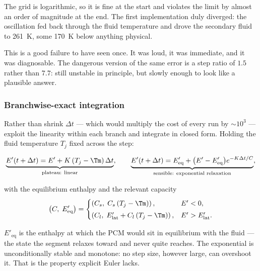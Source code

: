 \noindent
The grid is logarithmic, so it is fine at the start and violates the limit by
almost an order of magnitude at the end. The first implementation duly
diverged: the oscillation fed back through the fluid temperature and drove the
secondary fluid to \SI{261}{\kelvin}, some \SI{170}{\kelvin} below anything
physical.

This is a good failure to have seen once. It was loud, it was immediate, and it
was diagnosable. The dangerous version of the same error is a step ratio of
$1.5$ rather than $7.7$: still unstable in principle, but slowly enough to look
like a plausible answer.

\subsubsection{Branchwise-exact integration}

Rather than shrink $\Delta t$ --- which would multiply the cost of every run by
$\sim\!10^{3}$ --- exploit the linearity within each branch and integrate in
closed form. Holding the fluid temperature $T_{j}$ fixed across the step:

\begin{equation}
  \underbrace{E'(t+\Delta t) = E' + K\left(T_{j}-\Tm\right)\Delta t}
             _{\text{plateau: linear}},
  \qquad
  \underbrace{E'(t+\Delta t) = E'_{\mathrm{eq}}
    + \bigl(E'-E'_{\mathrm{eq}}\bigr)e^{-K\Delta t/C}}
             _{\text{sensible: exponential relaxation}},
  \label{eq:enth-exact}
\end{equation}

\noindent
with the equilibrium enthalpy and the relevant capacity
\begin{equation}
  \left(C,\;E'_{\mathrm{eq}}\right) =
  \begin{cases}
    \left(C_{s},\; C_{s}\left(T_{j}-\Tm\right)\right), & E' < 0,\\[3pt]
    \left(C_{l},\; E'_{\mathrm{lat}} + C_{l}\left(T_{j}-\Tm\right)\right),
      & E' > E'_{\mathrm{lat}}.
  \end{cases}
\end{equation}

$E'_{\mathrm{eq}}$ is the enthalpy at which the PCM would sit in equilibrium
with the fluid --- the state the segment relaxes toward and never quite reaches.
The exponential is unconditionally stable and monotone: no step size, however
large, can overshoot it. That is the property explicit Euler lacks.

